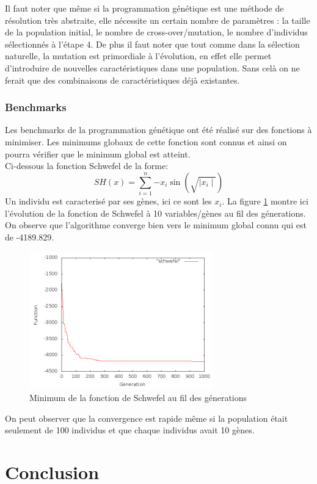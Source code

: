 \documentclass{report}
\begin{document}
Il faut noter que même si la programmation génétique est une méthode
de résolution très abstraite, elle nécessite un certain nombre de
paramètres : la taille de la population initial, le nombre de
cross-over/mutation, le nombre d'individus sélectionnés à l'étape 4.
De plus il faut noter que tout comme dans la sélection naturelle, la
mutation est primordiale à l'évolution, en effet elle permet
d'introduire de nouvelles caractéristiques dans une population. Sans
celà on ne ferait que des combinaisons de caractéristiques déjà
existantes.

\subsection{Benchmarks}

Les benchmarks de la programmation génétique ont été réalisé sur des
fonctions à minimiser. Les minimums globaux de cette fonction sont
connus et ainsi on pourra vérifier que le minimum global est
atteint.\\ Ci-dessous la fonction Schwefel de la forme:
$$SH(x) = \sum_{i=1}^{n}{-x_i\sin{(\sqrt{\mid{}x_i\mid{}})}}$$ Un
individu est caracterisé par ses gènes, ici ce sont les $x_i$.  La
figure \ref{geneticschwefel} montre ici l'évolution de la fonction de
Schwefel à 10 variables/gènes au fil des génerations. On observe que
l'algorithme converge bien vers le minimum global connu qui est de
-4189.829.
\begin{figure}[H]
  \centering
  \includegraphics[width=300px]{genetic_schwefel.png}
  \caption{Minimum de la fonction de Schwefel au fil des génerations}
  \label{geneticschwefel}
\end{figure}

On peut observer que la convergence est rapide même si la population
était seulement de 100 individus et que chaque individus avait 10
gènes.

\chapter{Conclusion}
\end{document}
